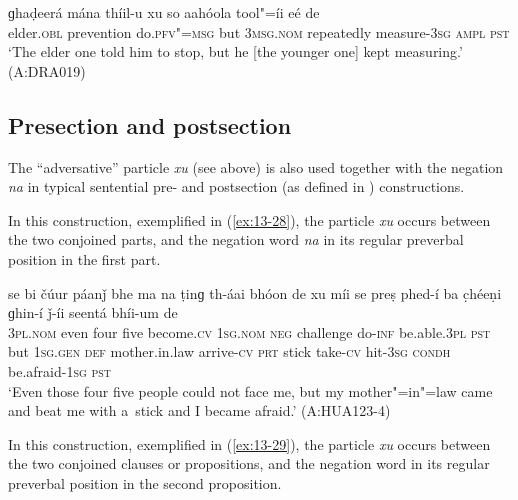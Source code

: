 \begin{exe}
\ex
\label{ex:13-27}
\gll ɡhaḍeerá mána thíil-u xu so aahóola tool"=íi eé de \\
elder.\textsc{obl} prevention do.\textsc{pfv"=msg} but \textsc{3msg.nom} repeatedly measure-\textsc{3sg} \textsc{ampl}{\protect\footnotemark} \textsc{pst} \\
\glt `The elder one told him to stop, but he [the younger one] kept measuring.' (A:DRA019)
\end{exe}


\subsection{Presection and postsection}
\label{subsec:13-2-2}

The ``adversative'' particle \textit{xu} (see above) is also used together with the negation \textit{na} in typical sentential pre- and postsection (as defined in ) constructions.


 In this construction, exemplified in (\ref{ex:13-28}), the particle \textit{xu} occurs between the two conjoined parts, and the negation word \textit{na} in its regular preverbal position in the first part.

\begin{exe}
\ex
\label{ex:13-28}
\gll se bi čúur páanǰ bhe ma na ṭinɡ th-áai bhóon de xu míi se preṣ phed-í ba c̣héeṇi ɡhin-í ǰ-íi seentá bhíi-um de \\
\textsc{3pl.nom} even four five become.\textsc{cv} \textsc{1sg.nom} \textsc{neg}  challenge do-\textsc{inf} be.able.\textsc{3pl} \textsc{pst} but \textsc{1sg.gen}  \textsc{def} mother.in.law arrive-\textsc{cv} \textsc{prt} stick take-\textsc{cv} hit-\textsc{3sg} \textsc{condh} be.afraid-\textsc{1sg} \textsc{pst} \\
\glt `Even those four five people could not face me, but my mother"=in"=law came and beat me with a~stick and I became afraid.' (A:HUA123-4) 
\end{exe}

 In this construction, exemplified in (\ref{ex:13-29}), the particle \textit{xu} occurs between the two conjoined clauses or propositions, and the negation word in its regular preverbal position in the second proposition.

